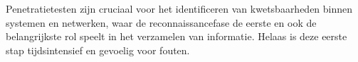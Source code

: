
%
%
%
%
%

%



\chapter*{}

Penetratietesten zijn cruciaal voor het identificeren van kwetsbaarheden binnen systemen en netwerken, waar de reconnaissancefase de eerste en ook de belangrijkste rol speelt in het verzamelen van informatie.
Helaas is deze eerste stap tijdsintensief en gevoelig voor fouten.\\

